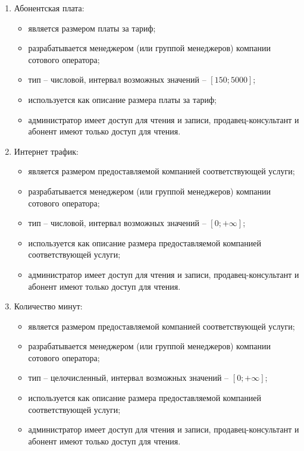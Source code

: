 \begin{enumerate}
\begin{enumerate}
        \item Абонентская плата:
        \begin{itemize}
            \item является размером платы за тариф;
            \item разрабатывается менеджером (или группой менеджеров) компании сотового оператора;
            \item тип -- числовой, интервал возможных значений -- $[150; 5000]$;
            \item используется как описание размера платы за тариф;
            \item администратор имеет доступ для чтения и записи, продавец-консультант и абонент имеют только доступ для чтения.
        \end{itemize}

        \item Интернет трафик:
        \begin{itemize}
            \item является размером предоставляемой компанией соответствующей услуги;
            \item разрабатывается менеджером (или группой менеджеров) компании сотового оператора;
            \item тип -- числовой, интервал возможных значений -- $[0; +\infty]$; %
            \item используется как описание размера предоставляемой компанией соответствующей услуги;
            \item администратор имеет доступ для чтения и записи, продавец-консультант и абонент имеют только доступ для чтения.
        \end{itemize}

        \item Количество минут:
        \begin{itemize}
            \item является размером предоставляемой компанией соответствующей услуги;
            \item разрабатывается менеджером (или группой менеджеров) компании сотового оператора;
            \item тип -- целочисленный, интервал возможных значений -- $[0; +\infty]$; %
            \item используется как описание размера предоставляемой компанией соответствующей услуги;
            \item администратор имеет доступ для чтения и записи, продавец-консультант и абонент имеют только доступ для чтения.
        \end{itemize}


\end{enumerate}
\end{enumerate}

